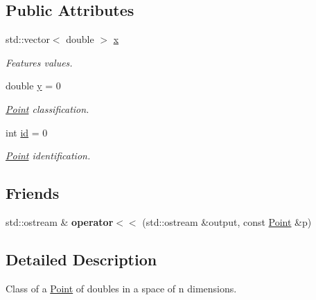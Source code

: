 \subsection*{Public Attributes}
\begin{DoxyCompactItemize}
\item 
\mbox{\label{class_point_a1e22056737f10e31025b353c86e3b9e3}} 
std\+::vector$<$ double $>$ \hyperlink{class_point_a1e22056737f10e31025b353c86e3b9e3}{x}
\begin{DoxyCompactList}\small\item\em Features values. \end{DoxyCompactList}\item 
\mbox{\label{class_point_afa38be143ae800e6ad69ce8ed4df62d8}} 
double \hyperlink{class_point_afa38be143ae800e6ad69ce8ed4df62d8}{y} = 0
\begin{DoxyCompactList}\small\item\em \hyperlink{class_point}{Point} classification. \end{DoxyCompactList}\item 
\mbox{\label{class_point_a3ccd2080027d6845744bd044280da9e7}} 
int \hyperlink{class_point_a3ccd2080027d6845744bd044280da9e7}{id} = 0
\begin{DoxyCompactList}\small\item\em \hyperlink{class_point}{Point} identification. \end{DoxyCompactList}\end{DoxyCompactItemize}
\subsection*{Friends}
\begin{DoxyCompactItemize}
\item 
\mbox{\label{class_point_a18e1e2eb3b3b27719f367688e8611b45}} 
std\+::ostream \& {\bfseries operator$<$$<$} (std\+::ostream \&output, const \hyperlink{class_point}{Point} \&p)
\end{DoxyCompactItemize}


\subsection{Detailed Description}
Class of a \hyperlink{class_point}{Point} of doubles in a space of n dimensions. 

